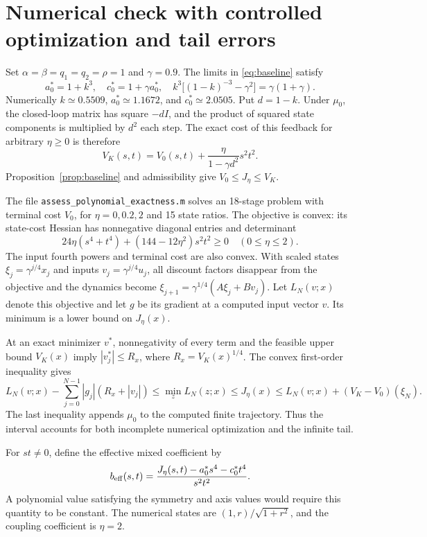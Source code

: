 \documentclass[10pt]{article}
\begin{document}
\section{Numerical check with controlled optimization and tail errors}

Set $\alpha=\beta=q_1=q_2=\rho=1$ and $\gamma=0.9$. The limits in \eqref{eq:baseline} satisfy
\begin{equation}
 a_0^*=1+k^3,\quad c_0^*=1+\gamma a_0^*,\quad
 k^3\bigl[(1-k)^{-3}-\gamma^2\bigr]=\gamma(1+\gamma).
 \label{eq:numerical-base}
\end{equation}
Numerically $k\simeq0.5509$, $a_0^*\simeq1.1672$, and $c_0^*\simeq2.0505$. Put $d=1-k$. Under $\mu_0$, the closed-loop matrix has square $-dI$, and the product of squared state components is multiplied by $d^2$ each step. The exact cost of this feedback for arbitrary $\eta\geq0$ is therefore
\begin{equation}
 V_K(s,t)=V_0(s,t)+\frac{\eta}{1-\gamma d^2}s^2t^2.
 \label{eq:upper}
\end{equation}
Proposition~\ref{prop:baseline} and admissibility give $V_0\leq J_\eta\leq V_K$.

The file \texttt{assess\_polynomial\_exactness.m} solves an 18-stage problem with terminal cost $V_0$, for $\eta=0,0.2,2$ and 15 state ratios. The objective is convex: its state-cost Hessian has nonnegative diagonal entries and determinant
\[
 24\eta(s^4+t^4)+(144-12\eta^2)s^2t^2\geq0
 \quad(0\leq\eta\leq2).
\]
The input fourth powers and terminal cost are also convex. With scaled states $\xi_j=\gamma^{j/4}x_j$ and inputs $v_j=\gamma^{j/4}u_j$, all discount factors disappear from the objective and the dynamics become $\xi_{j+1}=\gamma^{1/4}(A\xi_j+Bv_j)$. Let $L_N(v;x)$ denote this objective and let $g$ be its gradient at a computed input vector $v$. Its minimum is a lower bound on $J_\eta(x)$.

At an exact minimizer $v^*$, nonnegativity of every term and the feasible upper bound $V_K(x)$ imply $|v_j^*|\leq R_x$, where $R_x=V_K(x)^{1/4}$. The convex first-order inequality gives
\begin{equation}
 L_N(v;x)-\sum_{j=0}^{N-1}|g_j|(R_x+|v_j|)
 \leq \min_z L_N(z;x)\leq J_\eta(x)
 \leq L_N(v;x)+(V_K-V_0)(\xi_N).
 \label{eq:numerical-bounds}
\end{equation}
The last inequality appends $\mu_0$ to the computed finite trajectory. Thus the interval accounts for both incomplete numerical optimization and the infinite tail.

For $st\ne0$, define the effective mixed coefficient by
\begin{equation}
 b_{\rm eff}(s,t)=\frac{J_\eta(s,t)-a_0^*s^4-c_0^*t^4}{s^2t^2}.
 \label{eq:effective}
\end{equation}
A polynomial value satisfying the symmetry and axis values would require this quantity to be constant. The numerical states are $(1,r)/\sqrt{1+r^2}$, and the coupling coefficient is $\eta=2$.
\end{document}
